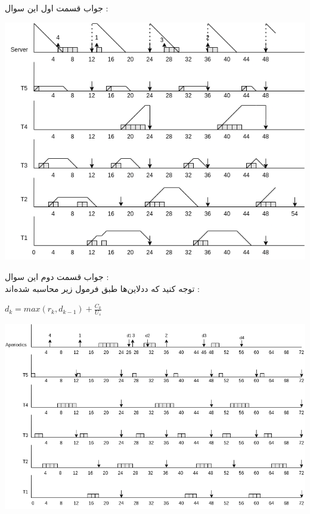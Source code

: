 جواب قسمت اول این سوال : 
\begin{center}
    \includegraphics[scale=0.5]{pics/DPE.png}
\end{center}
جواب قسمت دوم این سوال :‌\\
توجه کنید که ددلاین‌ها طبق فرمول زیر محاسبه شده‌اند : 
\begin{latin}
    $d_k = max(r_k,d_{k-1}) + \frac{C_k}{U_s}$
\end{latin}
\begin{center}
    \includegraphics[scale=0.45]{pics/TBS.png}
\end{center}